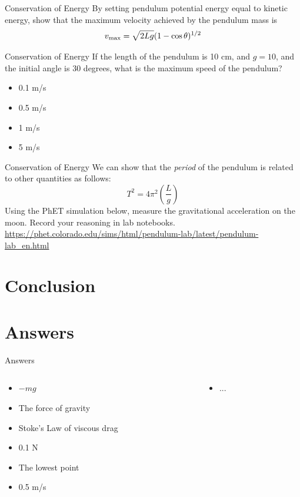\documentclass{beamer}
\begin{document}
\begin{frame}{Conservation of Energy}
By setting pendulum potential energy equal to kinetic energy, show that the maximum velocity achieved by the pendulum mass is
\begin{equation}
v_{\rm max} = \sqrt{2Lg}(1-\cos\theta)^{1/2}
\end{equation}
\end{frame}

\begin{frame}{Conservation of Energy}
If the length of the pendulum is 10 cm, and $g = 10$, and the initial angle is 30 degrees, what is the maximum speed of the pendulum? 
\begin{itemize}
\item 0.1 m/s
\item 0.5 m/s
\item 1 m/s
\item 5 m/s
\end{itemize}
\end{frame}

\begin{frame}{Conservation of Energy}
We can show that the \textit{period} of the pendulum is related to other quantities as follows:
\begin{equation}
T^2 = 4\pi^2 \left(\frac{L}{g}\right)
\end{equation}
Using the PhET simulation below, measure the gravitational acceleration on the moon.  Record your reasoning in lab notebooks. \\ \vspace{1cm}
\url{https://phet.colorado.edu/sims/html/pendulum-lab/latest/pendulum-lab_en.html}
\end{frame}

\section{Conclusion}

\section{Answers}

\begin{frame}{Answers}
\begin{columns}[T]
\begin{column}{0.5\textwidth}
\begin{itemize}
\item $-mg$
\item The force of gravity
\item Stoke's Law of viscous drag
\item 0.1 N
\item The lowest point
\item 0.5 m/s
\end{itemize}
\end{column}
\begin{column}{0.5\textwidth}
\begin{itemize}
\item ...
\end{itemize}
\end{column}
\end{columns}
\end{frame}
\end{document}
